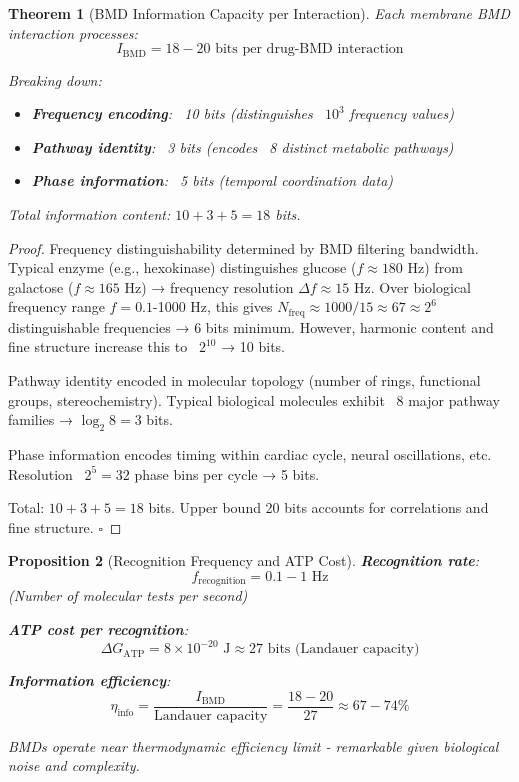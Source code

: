 \documentclass[11pt,a4paper]{article}
\newtheorem{theorem}{Theorem}[section]
\newtheorem{proposition}[theorem]{Proposition}
\theoremstyle{definition}
\theoremstyle{remark}
\begin{document}
\begin{theorem}[BMD Information Capacity per Interaction]
\label{thm:bmd_capacity}
Each membrane BMD interaction processes:
\begin{equation}
I_{\text{BMD}} = 18-20 \text{ bits per drug-BMD interaction}
\end{equation}

Breaking down:
\begin{itemize}
\item \textbf{Frequency encoding}: ~10 bits (distinguishes ~$10^3$ frequency values)
\item \textbf{Pathway identity}: ~3 bits (encodes ~8 distinct metabolic pathways)
\item \textbf{Phase information}: ~5 bits (temporal coordination data)
\end{itemize}

Total information content: $10 + 3 + 5 = 18$ bits.
\end{theorem}

\begin{proof}
Frequency distinguishability determined by BMD filtering bandwidth. Typical enzyme (e.g., hexokinase) distinguishes glucose ($f \approx 180$ Hz) from galactose ($f \approx 165$ Hz) → frequency resolution $\Delta f \approx 15$ Hz. Over biological frequency range $f = 0.1$-1000 Hz, this gives $N_{\text{freq}} \approx 1000/15 \approx 67 \approx 2^6$ distinguishable frequencies → 6 bits minimum. However, harmonic content and fine structure increase this to ~$2^{10}$ → 10 bits.

Pathway identity encoded in molecular topology (number of rings, functional groups, stereochemistry). Typical biological molecules exhibit ~8 major pathway families → $\log_2 8 = 3$ bits.

Phase information encodes timing within cardiac cycle, neural oscillations, etc. Resolution ~$2^5 = 32$ phase bins per cycle → 5 bits.

Total: $10 + 3 + 5 = 18$ bits. Upper bound 20 bits accounts for correlations and fine structure. $\square$
\end{proof}

\begin{proposition}[Recognition Frequency and ATP Cost]
\textbf{Recognition rate}:
\begin{equation}
f_{\text{recognition}} = 0.1 - 1 \text{ Hz}
\end{equation}
(Number of molecular tests per second)

\textbf{ATP cost per recognition}:
\begin{equation}
\Delta G_{\text{ATP}} = 8 \times 10^{-20} \text{ J} \approx 27 \text{ bits (Landauer capacity)}
\end{equation}

\textbf{Information efficiency}:
\begin{equation}
\eta_{\text{info}} = \frac{I_{\text{BMD}}}{\text{Landauer capacity}} = \frac{18-20}{27} \approx 67-74\%
\end{equation}

BMDs operate near thermodynamic efficiency limit - remarkable given biological noise and complexity.
\end{proposition}
\end{document}
